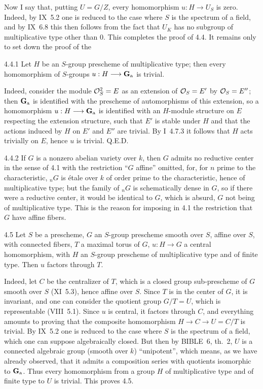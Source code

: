 Now I say that, putting $U=G/Z$, every homomorphism $u:H\to U_S$ is zero. Indeed, by IX~5.2 one is reduced to the case where $S$ is the spectrum of a field, and by IX~6.8 this then follows from the fact that $U_K$ has no subgroup of multiplicative type other than $0$. This completes the proof of 4.4. It remains only to set down the proof of the
\begin{lemma}{4.4.1}\label{XII.4.4.1}
Let $H$ be an $S$-group prescheme of multiplicative type; then every homomorphism of $S$-groups $u:H\longrightarrow\mathbf{G}_{\mathrm{a}}$ is trivial.
\end{lemma}
Indeed, consider the module $\mathcal{O}_S^2=E$ as an extension of $\mathcal{O}_S=E'$ by $\mathcal{O}_S=E''$; then $\mathbf{G}_{\mathrm{a}}$ is identified with the prescheme of automorphisms of this extension, so a homomorphism $u:H\longrightarrow\mathbf{G}_{\mathrm{a}}$ is identified with an $H$-module structure on $E$ respecting the extension structure, \ie such that $E'$ is stable under $H$ and that the actions induced by $H$ on $E'$ and $E''$ are trivial. By I~4.7.3 it follows that $H$ acts trivially on $E$, hence $u$ is trivial. \hfill Q.E.D.
\begin{remark}{4.4.2}\label{XII.4.4.2}
If $G$ is a nonzero abelian variety over $k$, then $G$ admits no reductive center in the sense of 4.1 with the restriction ``$G$ affine'' omitted, for, for $n$ prime to the characteristic, ${}_nG$ is étale over $k$ of order prime to the characteristic, hence of multiplicative type; but the family of ${}_nG$ is schematically dense in $G$, so if there were a reductive center, it would be identical to $G$, which is absurd, $G$ not being of multiplicative type. This is the reason for imposing in 4.1 the restriction that $G$ have affine fibers.
\end{remark}
\begin{lemma}{4.5}\label{XII.4.5}
Let $S$ be a prescheme, $G$ an $S$-group prescheme smooth over $S$, affine over $S$, with connected fibers, $T$ a maximal torus of $G$, $u:H\to G$ a central homomorphism, with $H$ an $S$-group prescheme of multiplicative type and of finite type. Then $u$ factors through $T$.
\end{lemma}
Indeed, let $C$ be the centralizer of $T$, which is a closed group sub-prescheme of $G$ smooth over $S$ (XI~5.3), hence affine over $S$. Since $T$ is in the center of $G$, it is invariant, and one can consider the quotient group $G/T=U$, which is representable (VIII~5.1). Since $u$ is central, it factors through $C$, and everything amounts to proving that the composite homomorphism $H\to C\to U=C/T$ is trivial. By IX~5.2 one is reduced to the case where $S$ is the spectrum of a field, which one can suppose algebraically closed. But then by BIBLE~6, th.~2, $U$ is a connected algebraic group (smooth over $k$) ``unipotent'', which means, as we have already observed, that it admits a composition series with quotients isomorphic to $\mathbf{G}_{\mathrm{a}}$. Thus every homomorphism from a group $H$ of multiplicative type and of finite type to $U$ is trivial. This proves 4.5.
